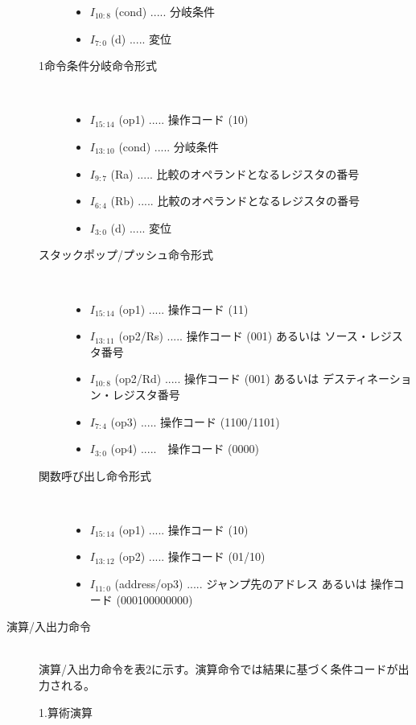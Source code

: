 \documentclass{jarticle}
\begin{document}
\begin{description}
\begin{description}
\begin{itemize}
\item $I_{10:8}$ (cond) ..... 分岐条件
\item $I_{7:0}$ (d) ..... 変位
\end{itemize}
\item[1命令条件分岐命令形式] \leavevmode \\
\begin{itemize}
\item $I_{15:14}$ (op1) ..... 操作コード (10)
\item $I_{13:10}$ (cond) ..... 分岐条件
\item $I_{9:7}$ (Ra) ..... 比較のオペランドとなるレジスタの番号
\item $I_{6:4}$ (Rb) ..... 比較のオペランドとなるレジスタの番号
\item $I_{3:0}$ (d) ..... 変位
\end{itemize}
\item[スタックポップ/プッシュ命令形式] \leavevmode \\
\begin{itemize}
\item $I_{15:14}$ (op1) ..... 操作コード (11)
\item $I_{13:11}$ (op2/Rs) ..... 操作コード (001) あるいは ソース・レジスタ番号
\item $I_{10:8}$ (op2/Rd) ..... 操作コード (001) あるいは デスティネーション・レジスタ番号
\item $I_{7:4}$ (op3) ..... 操作コード (1100/1101)
\item $I_{3:0}$ (op4) .....　操作コード (0000)
\end{itemize}
\item[関数呼び出し命令形式] \leavevmode \\
\begin{itemize}
\item $I_{15:14}$ (op1) ..... 操作コード (10)
\item $I_{13:12}$ (op2) ..... 操作コード (01/10)
\item $I_{11:0}$ (address/op3) ..... ジャンプ先のアドレス あるいは 操作コード (000100000000)
\end{itemize}
\end{description}
\item[演算/入出力命令] \leavevmode \\
演算/入出力命令を表2に示す。演算命令では結果に基づく条件コードが出力される。
\begin{description}
\item[1.算術演算] \leavevmode \\

\end{description}
\end{description}
\end{document}
